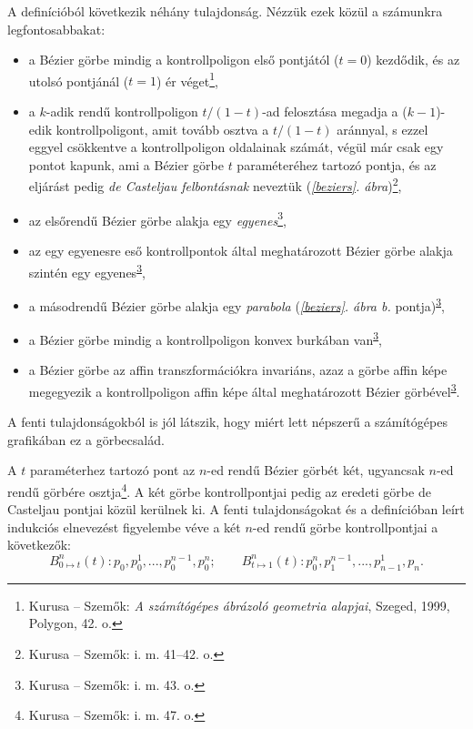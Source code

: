 \documentclass[12pt]{report}
\theoremstyle{definition}
\begin{document}
A definícióból következik néhány tulajdonság. Nézzük ezek közül a számunkra
legfontosabbakat:
\begin{itemize}[noitemsep,topsep=0pt]
  \item a Bézier görbe mindig a kontrollpoligon első pontjától ($t=0$) kezdődik,
  és az utolsó pontjánál ($t=1$) ér véget\footnote{Kurusa -- Szemők: \emph{A
  számítógépes ábrázoló geometria alapjai}, Szeged, 1999, Polygon, 42. o.},
  \item a $k$-adik rendű kontrollpoligon $t/(1-t)$-ad felosztása megadja a
  ($k-1$)-edik kontrollpoligont, amit tovább osztva a $t/(1-t)$ aránnyal, s
  ezzel eggyel csökkentve a kontrollpoligon oldalainak számát, végül már csak
  egy pontot kapunk, ami a Bézier görbe $t$ paraméteréhez tartozó pontja, és az
  eljárást pedig \emph{de Casteljau felbontásnak} neveztük (\emph{\ref{beziers}.
  ábra})\footnote{Kurusa -- Szemők: i. m. 41--42. o.},
  \item az elsőrendű Bézier görbe alakja egy \emph{egyenes}\footnote{Kurusa --
  Szemők: i. m. 43. o.\label{fn:Kurusa:43p}},
  \item az egy egyenesre eső kontrollpontok által meghatározott Bézier görbe
  alakja szintén egy egyenes\textsuperscript{\ref{fn:Kurusa:43p}},
  \item a másodrendű Bézier görbe alakja egy \emph{parabola}
  (\emph{\ref{beziers}. ábra b.} pontja)\textsuperscript{\ref{fn:Kurusa:43p}},
  \item a Bézier görbe mindig a kontrollpoligon konvex burkában
  van\textsuperscript{\ref{fn:Kurusa:43p}},
  \item a Bézier görbe az affin transzformációkra invariáns, azaz a görbe affin
  képe megegyezik a kontrollpoligon affin képe által meghatározott Bézier
  görbével\textsuperscript{\ref{fn:Kurusa:43p}}.
\end{itemize}

A fenti tulajdonságokból is jól látszik, hogy miért lett népszerű a számítógépes
grafikában ez a görbecsalád.

A $t$ paraméterhez tartozó pont az $n$-ed rendű Bézier görbét két, ugyancsak
$n$-ed rendű görbére osztja\footnote{Kurusa -- Szemők: i. m. 47. o.}. A két
görbe kontrollpontjai pedig az eredeti görbe de Casteljau pontjai közül kerülnek
ki. A fenti tulajdonságokat és a definícióban leírt indukciós elnevezést
figyelembe véve a két $n$-ed rendű görbe kontrollpontjai a következők:
\begin{equation}\label{eq:1} B_{0\mapsto t}^n(t): p_0, p_0^1, ..., p_0^{n-1},
p_0^n; \qquad B_{t\mapsto 1}^n(t): p_0^n, p_1^{n-1}, ..., p_{n-1}^1, p_n.
\end{equation}
\end{document}
